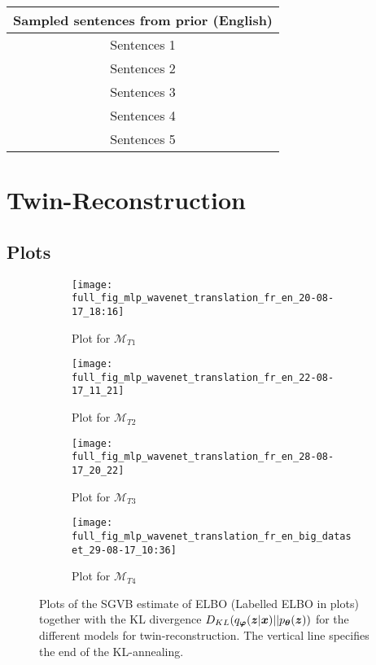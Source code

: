 \begin{center}
  \begin{tabular}{|c|} 
    \hline
    Sampled sentences from prior (English)\\ [0.5ex] 
    \hline\hline
    Sentences 1\\ 
    \hline
    Sentences 2\\
    \hline
    Sentences 3\\
    \hline
    Sentences 4\\
    \hline
    Sentences 5\\
    \hline
  \end{tabular}
\end{center}

\section{Twin-Reconstruction}

\subsection{Plots}

\begin{figure}[H]
  \centering
  \begin{subfigure}[b]{0.5\textwidth}
    \centering
    \texttt{[image: full\_fig\_mlp\_wavenet\_translation\_fr\_en\_20-08-17\_18:16]}
    \caption{Plot for $\mathcal{M}_{T1}$}
    \label{fig:translate_M1}
  \end{subfigure}%
  \begin{subfigure}[b]{0.5\textwidth}
    \centering
    \texttt{[image: full\_fig\_mlp\_wavenet\_translation\_fr\_en\_22-08-17\_11\_21]}
    \caption{Plot for $\mathcal{M}_{T2}$}
    \label{fig:translate_M2}
  \end{subfigure}
  \begin{subfigure}[b]{0.5\textwidth}
    \centering
    \texttt{[image: full\_fig\_mlp\_wavenet\_translation\_fr\_en\_28-08-17\_20\_22]}
    \caption{Plot for $\mathcal{M}_{T3}$}
    \label{fig:translate_M3}
  \end{subfigure}%
  \begin{subfigure}[b]{0.5\textwidth}
    \centering
    \texttt{[image: full\_fig\_mlp\_wavenet\_translation\_fr\_en\_big\_dataset\_29-08-17\_10:36]}
    \caption{Plot for $\mathcal{M}_{T4}$}
    \label{fig:translate_M4}
  \end{subfigure}
  \caption{Plots of the SGVB estimate of ELBO (Labelled ELBO in plots)
      together with the KL divergence $D_{KL}(q_{\bm{\varphi}}(\bm{z} |
        \bm{x}) || p_{\bm{\theta}}(\bm{z}))$ for the different models for twin-reconstruction. The
      vertical line specifies the end of the KL-annealing.}
\end{figure}

